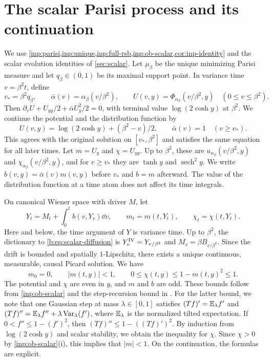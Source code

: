 \section{The scalar Parisi process and its continuation}\label{u:sec:scalar}

We use \cref{inp:parisi,inp:unique,inp:full-rsb,inp:ob-scalar,cor:inp-identity}
and the scalar evolution identities of \cref{sec:scalar}.
Let $\mu_\beta$ be the unique minimizing Parisi measure and let
$q_\beta\in(0,1)$ be its maximal support point. In variance time
$v=\beta^2t$, define
\[
 v_*=\beta^2q_\beta,\qquad
 \bar\alpha(v)=\alpha_\beta(v/\beta^2),\qquad
 U(v,y)=\Phi_{\alpha_\beta}(v/\beta^2,y)
 \quad(0\le v\le\beta^2).
\]
Then $\partial_vU+U_{yy}/2+\bar\alpha U_y^2/2=0$, with terminal
value $\log(2\cosh y)$ at $\beta^2$. We continue the potential and the
distribution function by
\begin{equation}\label{u:eq:scalar-continuation}
 U(v,y)=\log(2\cosh y)+(\beta^2-v)/2,\qquad
 \bar\alpha(v)=1\quad(v\ge v_*).
\end{equation}
This agrees with the original solution on $[v_*,\beta^2]$ and
satisfies the same equation for all later times. Let $m=U_y$ and
$\chi=U_{yy}$. Up to $\beta^2$, these are
$u_{\alpha_\beta}(v/\beta^2,y)$ and
$\chi_{\alpha_\beta}(v/\beta^2,y)$, and for $v\ge v_*$ they are
$\tanh y$ and $\operatorname{sech}^2y$. We write
$b(v,y)=\bar\alpha(v)m(v,y)$ before $v_*$ and $b=m$ afterward.
The value of the distribution function at a time atom does not
affect its time integrals.

On canonical Wiener space with driver $M$, let
\begin{equation}\label{u:eq:scalar-process}
 Y_t=M_t+\int_0^t b(v,Y_v)\dd v,\qquad
 m_t=m(t,Y_t),\qquad \chi_t=\chi(t,Y_t).
\end{equation}
Here and below, the time argument of $Y$ is variance time. Up to
$\beta^2$, the dictionary to \eqref{b:eq:scalar-diffusion} is
$Y^{\rm IV}_v=Y_{v/\beta^2}$ and $M_v=\beta B_{v/\beta^2}$.
Since the drift is bounded and spatially $1$-Lipschitz, there exists
a unique continuous, measurable, causal Picard solution. We have
\begin{equation}\label{u:eq:scalar-bounds}
 m_0=0,\qquad |m(t,y)|<1,\qquad
 0\le\chi(t,y)\le1-m(t,y)^2\le1.
\end{equation}
The potential and $\chi$ are even in $y$, and $m$ and $b$ are odd.
These bounds follow from \cref{inp:ob-scalar} and the step-recursion
bound in \cite[Section~3]{oai-typical-upper}. For the latter bound, we note
that one Gaussian step at mass $\lambda\in[0,1]$ satisfies
$(Tf)'=\mathbb E_\lambda f'$ and
$(Tf)''=\mathbb E_\lambda f''+\lambda\operatorname{Var}_\lambda(f')$, where
$\mathbb E_\lambda$ is the normalized tilted expectation. If
$0<f''\le1-(f')^2$, then
$(Tf)''\le1-((Tf)')^2$.
By induction from $\log(2\cosh y)$ and scalar stability, we obtain
the inequality for $\chi$. Since $\chi>0$ by
\cref{inp:ob-scalar}(i), this implies that $|m|<1$. On the
continuation, the formulas are explicit.

